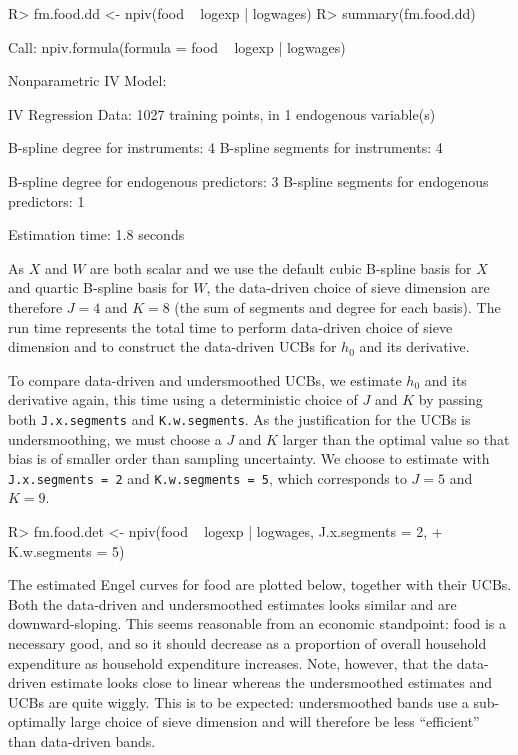 \documentclass[
]{jss}
\begin{document}
\begin{CodeChunk}
\begin{CodeInput}
R> fm.food.dd <- npiv(food ~ logexp | logwages)
R> summary(fm.food.dd)
\end{CodeInput}
\begin{CodeOutput}
Call:
npiv.formula(formula = food ~ logexp | logwages)

Nonparametric IV Model:

IV Regression Data: 1027 training points, in 1 endogenous variable(s)

B-spline degree for instruments:             4
B-spline segments for instruments:           4

B-spline degree for endogenous predictors:   3
B-spline segments for endogenous predictors: 1

Estimation time: 1.8 seconds
\end{CodeOutput}
\end{CodeChunk}

As \(X\) and \(W\) are both scalar and we use the default cubic B-spline
basis for \(X\) and quartic B-spline basis for \(W\), the data-driven
choice of sieve dimension are therefore \(J = 4\) and \(K = 8\) (the sum
of segments and degree for each basis). The run time represents the
total time to perform data-driven choice of sieve dimension and to
construct the data-driven UCBs for \(h_0\) and its derivative.

To compare data-driven and undersmoothed UCBs, we estimate \(h_0\) and
its derivative again, this time using a deterministic choice of \(J\)
and \(K\) by passing both \texttt{J.x.segments} and
\texttt{K.w.segments}. As the justification for the UCBs is
undersmoothing, we must choose a \(J\) and \(K\) larger than the optimal
value so that bias is of smaller order than sampling uncertainty. We
choose to estimate with \texttt{J.x.segments\ =\ 2} and
\texttt{K.w.segments\ =\ 5}, which corresponds to \(J = 5\) and
\(K = 9\).

\begin{CodeChunk}
\begin{CodeInput}
R> fm.food.det <- npiv(food ~ logexp | logwages, J.x.segments = 2, 
+                      K.w.segments = 5)
\end{CodeInput}
\end{CodeChunk}

The estimated Engel curves for food are plotted below, together with
their UCBs. Both the data-driven and undersmoothed estimates looks
similar and are downward-sloping. This seems reasonable from an economic
standpoint: food is a necessary good, and so it should decrease as a
proportion of overall household expenditure as household expenditure
increases. Note, however, that the data-driven estimate looks close to
linear whereas the undersmoothed estimates and UCBs are quite wiggly.
This is to be expected: undersmoothed bands use a sub-optimally large
choice of sieve dimension and will therefore be less ``efficient'' than
data-driven bands.
\end{document}
